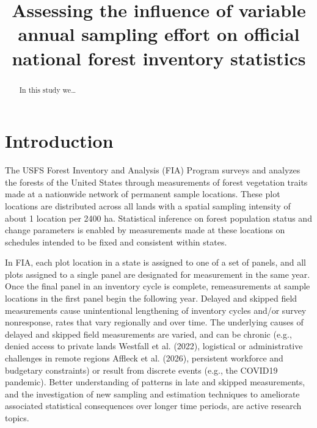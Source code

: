 \documentclass[
]{agujournal2019}
\renewcommand*\contentsname{Table of contents}
\newcommand\contentsname{Table of contents}
\begin{document}
\title{Assessing the influence of variable annual sampling effort on
official national forest inventory statistics}



\begin{abstract}
In this study we\ldots{}
\end{abstract}




\renewcommand*\contentsname{Table of contents}
{
\setcounter{tocdepth}{3}
\tableofcontents
}

\section{Introduction}\label{introduction}

The USFS Forest Inventory and Analysis (FIA) Program surveys and
analyzes the forests of the United States through measurements of forest
vegetation traits made at a nationwide network of permanent sample
locations. These plot locations are distributed across all lands with a
spatial sampling intensity of about 1 location per 2400 ha. Statistical
inference on forest population status and change parameters is enabled
by measurements made at these locations on schedules intended to be
fixed and consistent within states.

In FIA, each plot location in a state is assigned to one of a set of
panels, and all plots assigned to a single panel are designated for
measurement in the same year. Once the final panel in an inventory cycle
is complete, remeasurements at sample locations in the first panel begin
the following year. Delayed and skipped field measurements cause
unintentional lengthening of inventory cycles and/or survey nonresponse,
rates that vary regionally and over time. The underlying causes of
delayed and skipped field measurements are varied, and can be chronic
(e.g., denied access to private lands Westfall et al. (2022), logistical
or administrative challenges in remote regions Affleck et al. (2026),
persistent workforce and budgetary constraints) or result from discrete
events (e.g., the COVID19 pandemic). Better understanding of patterns in
late and skipped measurements, and the investigation of new sampling and
estimation techniques to ameliorate associated statistical consequences
over longer time periods, are active research topics.
\end{document}
